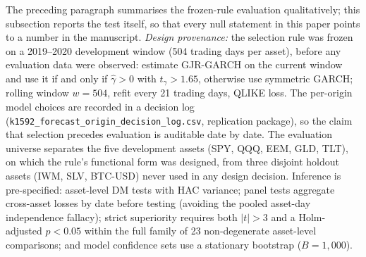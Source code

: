 The preceding paragraph summarises the frozen-rule evaluation qualitatively; this subsection reports the test itself, so that every null statement in this paper points to a number in the manuscript. \emph{Design provenance:} the selection rule was frozen on a 2019--2020 development window (504 trading days per asset), before any evaluation data were observed: estimate GJR-GARCH on the current window and use it if and only if $\hat{\gamma}>0$ with $t_{\gamma}>1.65$, otherwise use symmetric GARCH; rolling window $w=504$, refit every 21 trading days, QLIKE loss. The per-origin model choices are recorded in a decision log (\texttt{k1592\_forecast\_origin\_decision\_log.csv}, replication package), so the claim that selection precedes evaluation is auditable date by date. The evaluation universe separates the five development assets (SPY, QQQ, EEM, GLD, TLT), on which the rule's functional form was designed, from three disjoint holdout assets (IWM, SLV, BTC-USD) never used in any design decision. Inference is pre-specified: asset-level DM tests with HAC variance; panel tests aggregate cross-asset losses by date before testing (avoiding the pooled asset-day independence fallacy); strict superiority requires both $|t|>3$ \citep{harvey2016} and a Holm-adjusted $p<0.05$ within the full family of 23 non-degenerate asset-level comparisons; and model confidence sets \citep{hansen2011} use a stationary bootstrap ($B=1{,}000$).

